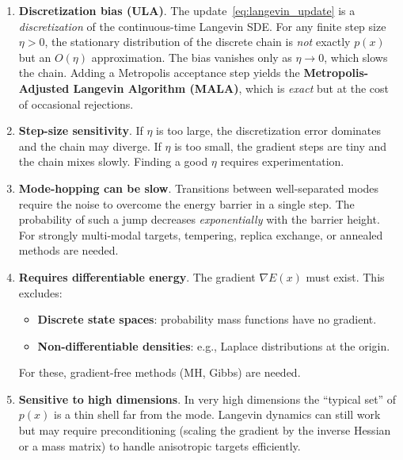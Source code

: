 \documentclass[12pt, a4paper]{article}
\begin{document}
\begin{enumerate}
    \item \textbf{Discretization bias (ULA)}.
          The update~\eqref{eq:langevin_update} is a
          \emph{discretization} of the continuous-time
          Langevin SDE.  For any finite step size $\eta > 0$,
          the stationary distribution of the discrete chain
          is \emph{not} exactly $p(x)$ but an $O(\eta)$
          approximation.  The bias vanishes only as
          $\eta \to 0$, which slows the chain.  Adding a
          Metropolis acceptance step yields the
          \textbf{Metropolis-Adjusted Langevin Algorithm
          (MALA)}, which is \emph{exact} but at the cost of
          occasional rejections.

    \item \textbf{Step-size sensitivity}.
          If $\eta$ is too large, the discretization error
          dominates and the chain may diverge.  If $\eta$ is
          too small, the gradient steps are tiny and the chain
          mixes slowly.  Finding a good $\eta$ requires
          experimentation.

    \item \textbf{Mode-hopping can be slow}.
          Transitions between well-separated modes require the
          noise to overcome the energy barrier in a single step.
          The probability of such a jump decreases
          \emph{exponentially} with the barrier height.
          For strongly multi-modal targets, tempering,
          replica exchange, or annealed methods are needed.

    \item \textbf{Requires differentiable energy}.
          The gradient $\nabla E(x)$ must exist.  This
          excludes:
          \begin{itemize}
              \item \textbf{Discrete state spaces}: probability
                    mass functions have no gradient.
              \item \textbf{Non-differentiable densities}:
                    e.g., Laplace distributions at the origin.
          \end{itemize}
          For these, gradient-free methods (MH, Gibbs) are
          needed.

    \item \textbf{Sensitive to high dimensions}.
          In very high dimensions the ``typical set'' of
          $p(x)$ is a thin shell far from the mode.
          Langevin dynamics can still work but may require
          preconditioning (scaling the gradient by the
          inverse Hessian or a mass matrix) to handle
          anisotropic targets efficiently.
\end{enumerate}
\end{document}
